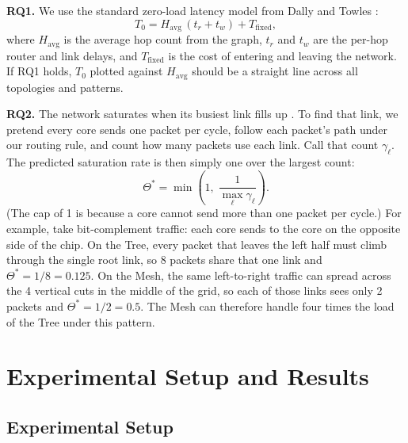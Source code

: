 \documentclass[conference]{IEEEtran}
\begin{document}
\textbf{RQ1.} We use the standard zero-load latency model from Dally and Towles \cite{b5}:
\begin{equation}
  T_0 = H_{\mathrm{avg}}\,(t_r + t_w) + T_{\mathrm{fixed}},
  \label{eq:t0}
\end{equation}
where $H_{\mathrm{avg}}$ is the average hop count from the graph, $t_r$ and $t_w$ are the per-hop router and link delays, and $T_{\mathrm{fixed}}$ is the cost of entering and leaving the network. If RQ1 holds, $T_0$ plotted against $H_{\mathrm{avg}}$ should be a straight line across all topologies and patterns.

\textbf{RQ2.} The network saturates when its busiest link fills up
\cite{b5}. To find that link, we pretend every core sends one packet
per cycle, follow each packet's path under our routing rule, and count
how many packets use each link. Call that count $\gamma_\ell$. The
predicted saturation rate is then simply one over the largest count:
\begin{equation}
  \Theta^{*} = \min\!\left(1,\;
  \frac{1}{\max_\ell \gamma_\ell}\right).
  \label{eq:theta}
\end{equation}
(The cap of 1 is because a core cannot send more than one packet per
cycle.) For example, take bit-complement traffic: each core
sends to the core on the opposite side of the chip. On the Tree, every packet that leaves the left half must climb through the single root link, so 8 packets share that one link and
$\Theta^{*} = 1/8 = 0.125$. On the Mesh, the same left-to-right
traffic can spread across the 4 vertical cuts in the middle of the
grid, so each of those links sees only 2 packets and
$\Theta^{*} = 1/2 = 0.5$. The Mesh can therefore handle four times
the load of the Tree under this pattern.

\section{Experimental Setup and Results}




\subsection{Experimental Setup}
\end{document}
